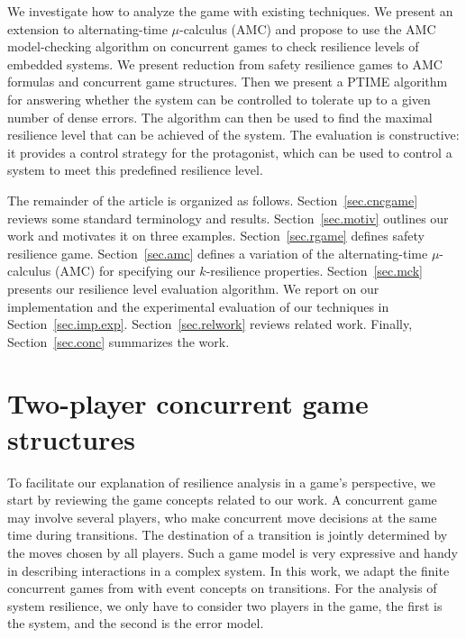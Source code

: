 \documentclass[times,10pt,twocolumn]{article}
\begin{document}
We investigate how to analyze the game with existing techniques. 
We present an extension to alternating-time $\mu$-calculus (AMC) 
and propose to use the AMC model-checking algorithm on concurrent games to check 
resilience levels of embedded systems. 
We present reduction from safety resilience games to 
AMC formulas and concurrent game structures.  
Then we present a PTIME algorithm for answering whether the system can be 
controlled to tolerate up to a given number of dense errors.  
The algorithm can then be used to find the maximal resilience level 
that can be achieved of the system. 
The evaluation is constructive:  
it provides a control strategy  
for the protagonist, which can be used to control a system 
to meet this predefined resilience level.  

The remainder of the article is organized as follows.
Section~\ref{sec.cncgame} reviews some standard terminology and results. 
Section~\ref{sec.motiv} outlines our work and motivates it on three examples.  
Section~\ref{sec.rgame} defines safety resilience game. 
Section~\ref{sec.amc} defines a variation of the alternating-time $\mu$-calculus (AMC) for specifying 
our $k$-resilience properties. 
Section~\ref{sec.mck} presents our resilience level evaluation algorithm. 
We report on\label{reply2.report.on} 
our implementation and the experimental evaluation of our techniques in Section~\ref{sec.imp.exp}. 
Section~\ref{sec.relwork} reviews related work. 
Finally, Section~\ref{sec.conc} summarizes the work. 






\section{Two-player concurrent game structures \label{sec.cncgame}} 

To facilitate our explanation of resilience analysis in a game's 
perspective, 
we start by reviewing the game concepts related to our work. 
A concurrent game may involve several players\label{reply1.multiple.players}, who make concurrent move decisions at the same time during transitions. 
The destination of a transition is jointly determined by the moves chosen by all players.  
Such a game model is very expressive and handy in 
describing interactions in a complex system.  
In this work, we adapt the finite concurrent games from \cite{AHK02} 
with event concepts on transitions.  
For the analysis of system resilience, 
we only have to consider two players in the game, 
the first is the system, and the second is the error model. 
\end{document}
